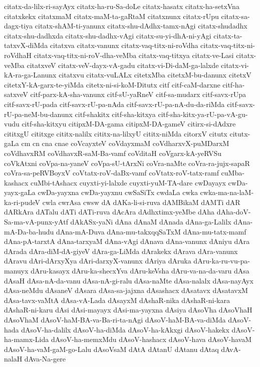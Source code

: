 {citatx-da-lilx-ri-sayAyx
citatx-ha-ru-Sa-doLe
citatx-hasatx
citatx-ha-setxVna
citatxkekx
citatxmaM
citatx-maM-ta-gaRtaM
citatxnunx
citatx-rUpu
citatx-sa-dagx-tiya
citatx-shAM-ti-yanunx
citatx-shu-dAdhx-tamx-nAgi
citatx-shudadhx
citatx-shu-dadhxda
citatx-shu-dadhx-vAgi
citatx-su-yi-dhA-ni-yAgi
citatx-ta-tatxvX-diMda
citatxva
citatx-vanunx
citatx-vaq-titx-ni-roVdha
citatx-vaq-titx-ni-roVdhaH
citatx-vaq-titx-ni-roV-dha-veMba
citatx-vaq-titxya
citatx-ve-Lasi
citatx-veMba
citatxveV
citatx-veV-dayx-vA-gadu
citatx-vi-Di-daM-ga-lalxde
citatx-vi-kA-ra-ga-Lanunx
citatxvu
citatx-vuLALx
citetxMba
citetxM-bu-danunx
citetxV
citetxY-kA-garx-te-yiMda
citetx-ni-si-koM-Ditutx
citf
citf-caM-darxne
citf-ha-satxveV
citf-parx-kA-sha-vanunx
citf-sU-yaRneV
citf-sa-mudarx
citf-savx-rUpa
citf-savx-rU-pada
citf-savx-rU-pa-nAda
citf-savx-rU-pa-nA-du-da-riMda
citf-savx-rU-pa-neM-bu-danunx
citf-shakitx
citf-sha-kitxya
citf-sha-kitx-ya-rU-pa-vA-gu-vudu
citf-sha-kitxyu
citipxM-DA-gama
citipxM-DA-gameV
citirx-si-dAdxre
cititxgU
cititxge
cititx-nalilx
cititx-na-lilxyU
cititx-niMda
citorxV
citutx
citutx-gaLa
cm
cn
cna
cnae
coVcayxteV
coVdayxmaM
coVdharxvX-puMDarxM
coVdhavxRM
coVdhavxR-saM-Ba-vamf
coVditaH
coVgarx-kA-yeRVSu
coVkAtxni
coVpa-na-yaneV
coVpa-sU-tArxNi
coVra-naMte
coVra-ra-jujx-sapaR
coVra-sa-peRVBoyxV
coVtatx-roV-daBx-vamf
coVtatx-roV-tatx-ramf
cuMba-kashacx
cuMbi-tAshacx
cuyxti-yi-lalxde
cuyxti-yuM-TA-dare
cwDayayx
cwDa-yayx-gaLa
cwDa-yayxna
cwDa-yayxnu
cwSaSiTx
cwdaLa
cwka
cwka-ma-na-laM-ka-ri-pudeV
cwla
cwrAsa
cwsw
dA
dAKa-li-si-ruva
dAMBikaM
dAMTi
dAR
dARkAra
dATalu
dATi
dATi-ruva
dAcAra
dAdhxtimx-yeMbe
dAha
dAha-doV-Sa-ma-vA-punx-yAtf
dAkASx-yaNi
dAna
dAnaM
dAnada
dAna-ga-Lalilx
dAna-mA-Da-ba-hudu
dAna-mA-Duva
dAna-mu-takxqqSaTxM
dAna-mu-tatx-mamf
dAna-pA-tarxtA
dAna-tarxyaM
dAna-vAgi
dAnava
dAna-vanunx
dAniyu
dAra
dArada
dAra-diM-dA-giyeV
dAra-ga-LiMda
dArakekx
dArava
dAra-vanunx
dAravu
dAri-dArxyXya
dAri-darxyX-vanunx
dAriya
dAruka
dAru-ka-ru-vu-pa-manuyx
dAru-kasayx
dAru-ka-shecxYva
dAru-keVsha
dAru-va-na-da-varu
dAsa
dAsaH
dAsa-nA-da-vanu
dAsa-nA-gi-ralu
dAsa-naMte
dAsa-nalalx
dAsa-nayAyx
dAsa-neMdu
dAsaneV
dAsara
dAsa-sa-jajxna
dAsashacx
dAsatavx
dAsatavxM
dAsa-tavx-vaMtA
dAsa-vA-Lada
dAsayxM
dAshaR-nika
dAshaR-ni-kara
dAshaR-ni-karu
dAsi
dAsi-mayayx
dAsi-ma-yayxna
dAsiya
dAsoVha
dAsoVhaH
dAsoVhaM
dAsoV-haM-BA-va-Ba-ri-ta-nAgi
dAsoV-haM-BA-va-diMda
dAsoV-hada
dAsoV-ha-dalilx
dAsoV-ha-diMda
dAsoV-ha-kAkxgi
dAsoV-hakekx
dAsoV-ha-mamx-Lida
dAsoV-ha-memxMdu
dAsoV-hashacx
dAsoV-hava
dAsoV-havaM
dAsoV-ha-vaM-gaM-go-Lalu
dAsoVsaM
dAtA
dAtanU
dAtanu
dAtaq
dAvA-nalaH
dAva-Na-gere
}
